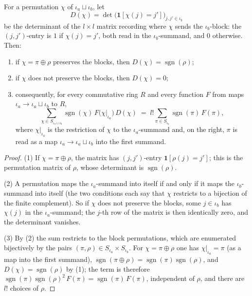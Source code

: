 \begin{lemma}
\label{lem:perm-block-collapse}




For a permutation $\chi$ of $\iota_a \sqcup \iota_b$, let
\[
D(\chi) = \det\big(\mathbf{1}[\chi(j) = j']\big)_{j, j' \in \iota_b}
\]
be the determinant of the $l \times l$ matrix recording where $\chi$ sends the $\iota_b$-block: the $(j,j')$-entry is $1$ if $\chi(j) = j'$, both read in the $\iota_b$-summand, and $0$ otherwise. Then:
\begin{enumerate}
\item if $\chi = \pi \oplus \rho$ preserves the blocks, then $D(\chi) = \operatorname{sgn}(\rho)$;
\item if $\chi$ does not preserve the blocks, then $D(\chi) = 0$;
\item consequently, for every commutative ring $R$ and every function $F$ from maps $\iota_a \to \iota_a \sqcup \iota_b$ to $R$,
\[
\sum_{\chi \in S_{\iota_a \sqcup \iota_b}} \operatorname{sgn}(\chi)\, F\big(\chi|_{\iota_a}\big)\, D(\chi)
  \;=\; l! \sum_{\pi \in S_{\iota_a}} \operatorname{sgn}(\pi)\, F(\pi),
\]
where $\chi|_{\iota_a}$ is the restriction of $\chi$ to the $\iota_a$-summand and, on the right, $\pi$ is read as a map $\iota_a \to \iota_a \sqcup \iota_b$ into the first summand.
\end{enumerate}
\end{lemma}
\begin{proof}

(1) If $\chi = \pi \oplus \rho$, the matrix has $(j,j')$-entry $\mathbf{1}[\rho(j) = j']$; this is the permutation matrix of $\rho$, whose determinant is $\operatorname{sgn}(\rho)$.

(2) A permutation maps the $\iota_a$-summand into itself if and only if it maps the $\iota_b$-summand into itself (the two conditions each say that $\chi$ restricts to a bijection of the finite complement). So if $\chi$ does not preserve the blocks, some $j \in \iota_b$ has $\chi(j)$ in the $\iota_a$-summand; the $j$-th row of the matrix is then identically zero, and the determinant vanishes.

(3) By (2) the sum restricts to the block permutations, which are enumerated bijectively by the pairs $(\pi, \rho) \in S_{\iota_a} \times S_{\iota_b}$. For $\chi = \pi \oplus \rho$ one has $\chi|_{\iota_a} = \pi$ (as a map into the first summand), $\operatorname{sgn}(\pi \oplus \rho) = \operatorname{sgn}(\pi)\operatorname{sgn}(\rho)$, and $D(\chi) = \operatorname{sgn}(\rho)$ by (1); the term is therefore $\operatorname{sgn}(\pi)\operatorname{sgn}(\rho)^2\, F(\pi) = \operatorname{sgn}(\pi)\, F(\pi)$, independent of $\rho$, and there are $l!$ choices of $\rho$.
\end{proof}

